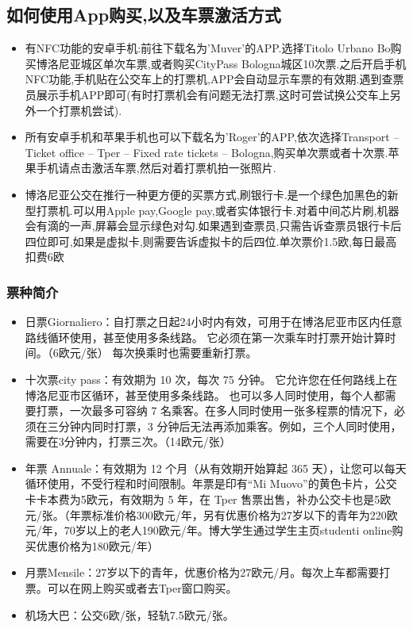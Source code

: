 \subsection{如何使用App购买,以及车票激活方式}
\begin{itemize}
\item 有NFC功能的安卓手机:前往下载名为'Muver'的APP.选择Titolo Urbano Bo购买博洛尼亚城区单次车票,或者购买CityPass Bologna城区10次票.之后开启手机NFC功能,手机贴在公交车上的打票机,APP会自动显示车票的有效期.遇到查票员展示手机APP即可(有时打票机会有问题无法打票,这时可尝试换公交车上另外一个打票机尝试).
\item 所有安卓手机和苹果手机也可以下载名为'Roger'的APP,依次选择Transport -- Ticket office -- Tper -- Fixed rate tickets -- Bologna,购买单次票或者十次票.苹果手机请点击激活车票,然后对着打票机拍一张照片.
\item 博洛尼亚公交在推行一种更方便的买票方式,刷银行卡.是一个绿色加黑色的新型打票机.可以用Apple pay,Google pay,或者实体银行卡.对着中间芯片刷,机器会有滴的一声,屏幕会显示绿色对勾.如果遇到查票员,只需告诉查票员银行卡后四位即可,如果是虚拟卡,则需要告诉虚拟卡的后四位.单次票价1.5欧,每日最高扣费6欧
\end{itemize}

\subsubsection{票种简介}
\begin{itemize}
\item 日票Giornaliero：自打票之日起24小时内有效，可用于在博洛尼亚市区内任意路线循环使用，甚至使用多条线路。 它必须在第一次乘车时打票开始计算时间。（6欧元/张）
每次换乘时也需要重新打票。
\item 十次票city pass：有效期为 10 次，每次 75 分钟。 它允许您在任何路线上在博洛尼亚市区循环，甚至使用多条线路。 也可以多人同时使用，每个人都需要打票，一次最多可容纳 7 名乘客。在多人同时使用一张多程票的情况下，必须在三分钟内同时打票，3 分钟后无法再添加乘客。例如，三个人同时使用，需要在3分钟内，打票三次。（14欧元/张）
\item 年票 Annuale：有效期为 12 个月（从有效期开始算起 365 天），让您可以每天循环使用，不受行程和时间限制。年票是印有“Mi Muovo”的黄色卡片，公交卡卡本费为5欧元，有效期为 5 年，在 Tper 售票出售，补办公交卡也是5欧元/张。（年票标准价格300欧元/年，另有优惠价格为27岁以下的青年为220欧元/年，70岁以上的老人190欧元/年。博大学生通过学生主页studenti online购买优惠价格为180欧元/年）
\item 月票Mensile：27岁以下的青年，优惠价格为27欧元/月。每次上车都需要打票。可以在网上购买或者去Tper窗口购买。
\item 机场大巴：公交6欧/张，轻轨7.5欧元/张。

\end{itemize}

